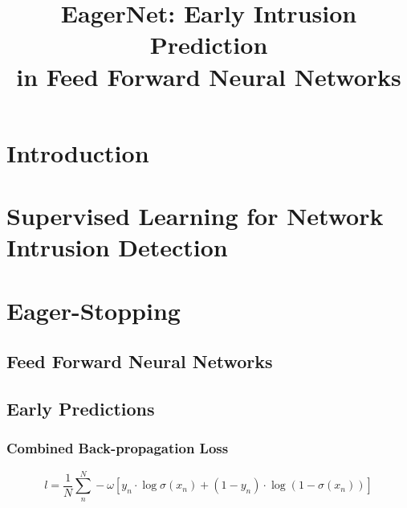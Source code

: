 \documentclass[conference]{IEEEtran}
\begin{document}
\title{EagerNet: Early Intrusion Prediction\\in Feed Forward Neural Networks}

\author{
}



\maketitle

\begin{abstract}

\end{abstract}

\begin{IEEEkeywords}

\end{IEEEkeywords}

\section{Introduction}

\section{Supervised Learning for Network Intrusion Detection}

\section{Eager-Stopping}
\subsection{Feed Forward Neural Networks}

\subsection{Early Predictions}
\subsubsection{Combined Back-propagation Loss}

\begin{equation}
l = \frac{1}{N} \sum_{n}^{N} -\omega [y_n \cdot \log \sigma (x_{n}) + (1 - y_n) \cdot \log (1 - \sigma (x_{n}))]
\end{equation}
\end{document}
